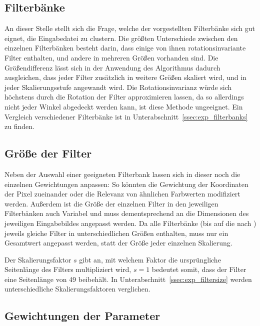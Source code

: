 
\subsection{Filterbänke}
\label{ssec:initialization_filterbanks}
An dieser Stelle stellt sich die Frage, welche der vorgestellten Filterbänke sich gut eignet, die Eingabedatei zu clustern. Die größten Unterschiede zwischen den einzelnen Filterbänken besteht darin, dass einige von ihnen rotationsinvariante Filter enthalten, und andere in mehreren Größen vorhanden sind. Die Größendifferenz lässt sich in der Anwendung des Algorithmus dadurch ausgleichen, dass jeder Filter zusätzlich in weitere Größen skaliert wird, und in jeder Skalierungsstufe angewandt wird. Die Rotationsinvarianz würde sich höchstens durch die Rotation der Filter approximieren lassen, da so allerdings nicht jeder Winkel abgedeckt werden kann, ist diese Methode ungeeignet. Ein Vergleich verschiedener Filterbänke ist in Unterabschnitt~\ref{ssec:exp_filterbanks} zu finden.

\subsection{Größe der Filter}
\label{ssec:initialization_filtersize}

Neben der Auswahl einer geeigneten Filterbank lassen sich in dieser noch die einzelnen Gewichtungen anpassen: So könnten \zB die Gewichtung der Koordinaten der Pixel zueinander oder die Relevanz von ähnlichen Farbwerten modifiziert werden. Außerdem ist die Größe der einzelnen Filter in den jeweiligen Filterbänken auch Variabel und muss dementsprechend an die Dimensionen des jeweiligen Eingabebildes angepasst werden. Da alle Filterbänke (bis auf die nach \cite{jain_91}) jeweils gleiche Filter in unterschiedlichen Größen enthalten, muss nur ein Gesamtwert angepasst werden, statt der Größe jeder einzelnen Skalierung. 

Der Skalierungsfaktor $s$ gibt an, mit welchem Faktor die ursprüngliche Seitenlänge des Filters multipliziert wird, $s=1$ bedeutet somit, dass der Filter eine Seitenlänge von \SI{49}{\pixel} beibehält. In Unterabschnitt~\ref{ssec:exp_filtersize} werden unterschiedliche Skalierungsfaktoren verglichen.

\subsection{Gewichtungen der Parameter}
\label{ssec:initialization_filterweight}

